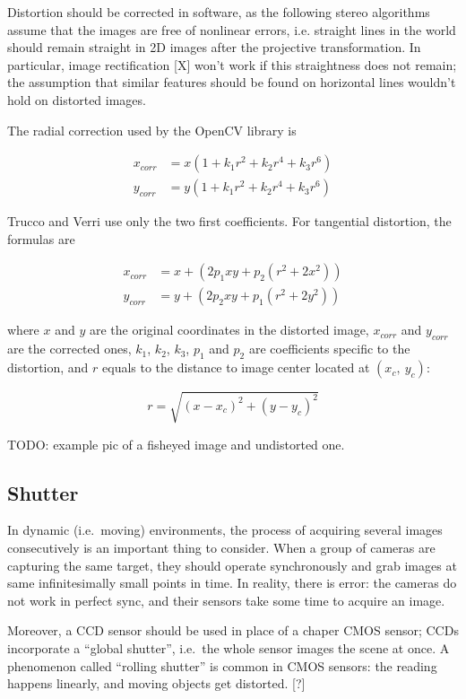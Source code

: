 Distortion should be corrected in software, as the following stereo algorithms assume that the images are free of nonlinear errors, i.e. straight lines in the world should remain straight in 2D images after the projective transformation.
In particular, image rectification [X] won't work if this straightness does not remain; the assumption that similar features should be found on horizontal lines wouldn't hold on distorted images.

The radial correction used by the OpenCV library is

\begin{align}
	x_{corr} &= x(1 + k_1 r^2 + k_2 r^4 + k_3 r^6)\\
	y_{corr} &= y(1 + k_1 r^2 + k_2 r^4 + k_3 r^6)
\end{align}

Trucco and Verri \cite{trucco1998introductory} use only the two first coefficients. For tangential distortion, the formulas are

\begin{align}
x_{corr} &= x + (2 p_1 x y + p_2 (r^2 + 2 x^2))\\
y_{corr} &= y + (2 p_2 x y + p_1 (r^2 + 2 y^2))
\end{align}

where $x$ and $y$ are the original coordinates in the distorted image, $x_{corr}$ and $y_{corr}$ are the corrected ones, $k_1$, $k_2$, $k_3$, $p_1$ and $p_2$ are coefficients specific to the distortion, and $r$ equals to the distance to image center located at $(x_c,~y_c)$:

\begin{equation}
r = \sqrt{(x - x_c)^2 + (y - y_c)^2}
\end{equation}

TODO: example pic of a fisheyed image and undistorted one.

\subsection{Shutter}

In dynamic (i.e.~moving) environments, the process of acquiring several images consecutively is an important thing to consider.
When a group of cameras are capturing the same target, they should operate synchronously and grab images at same infinitesimally small points in time.
In reality, there is error: the cameras do not work in perfect sync, and their sensors take some time to acquire an image.

Moreover, a CCD sensor should be used in place of a chaper CMOS sensor; CCDs incorporate a ``global shutter'', i.e.~the whole sensor images the scene at once.
A phenomenon called ``rolling shutter'' is common in CMOS sensors: the reading happens linearly, and moving objects get distorted. [?]

